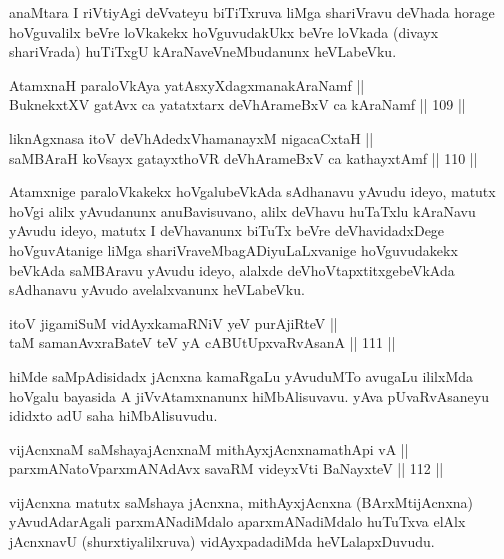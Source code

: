 \begin{artha}
anaMtara I riVtiyAgi deVvateyu biTiTxruva liMga shariVravu deVhada
horage hoVguvalilx beVre loVkakekx hoVguvudakUkx beVre loVkada (divayx
shariVrada) huTiTxgU kAraNaveVneMbudanunx heVLabeVku.
\end{artha}

\begin{shl}
AtamxnaH paraloVkAya yatAsxyXdagxmanakAraNamf ||  \\
BuknekxtXV gatAvx ca yatatxtarx deVhArameBxV ca kAraNamf \hfill || 109 ||  
\end{shl}

\begin{shl}
liknAgxnasa itoV deVhAdedxVhamanayxM nigacaCxtaH || \\
saMBAraH koV\s sayx gatayxthoVR deVhArameBxV ca kathayxtAmf \hfill || 110 ||  
\end{shl}

\begin{artha}
Atamxnige paraloVkakekx hoVgalubeVkAda sAdhanavu yAvudu ideyo, matutx
hoVgi alilx yAvudanunx anuBavisuvano, alilx deVhavu huTaTxlu kAraNavu
yAvudu ideyo, matutx I deVhavanunx biTuTx beVre deVhavidadxDege
hoVguvAtanige liMga shariVraveMbagADiyuLaLxvanige hoVguvudakekx
beVkAda saMBAravu yAvudu ideyo, alalxde deVhoVtapxtitxgebeVkAda
sAdhanavu yAvudo avelalxvanunx heVLabeVku.
\end{artha}


\begin{shl}
itoV jigamiSuM vidAyxkamaRNiV yeV purA\s jiRteV || \\
taM samanAvxraBateV teV yA cABUtUpxvaRvAsanA \hfill || 111 ||  
\end{shl}

\begin{artha}
hiMde saMpAdisidadx jAcnxna kamaRgaLu yAvuduMTo avugaLu ililxMda
hoVgalu bayasida A jiVvAtamxnanunx hiMbAlisuvavu. yAva pUvaRvAsaneyu
ididxto adU saha hiMbAlisuvudu.
\end{artha}

\begin{shl}
vijAcnxnaM saMshayajAcnxnaM mithAyxjAcnxnamathApi vA || \\
parxmANatoV\s parxmANAdAvx savaRM videyxVti BaNayxteV \hfill || 112 ||  
\end{shl}

\begin{artha}
vijAcnxna matutx saMshaya jAcnxna, mithAyxjAcnxna (BArxMtijAcnxna)
yAvudAdarAgali parxmANadiMdalo aparxmANadiMdalo huTuTxva elAlx
jAcnxnavU (shurxtiyalilxruva) vidAyxpadadiMda heVLalapxDuvudu.
\end{artha}

